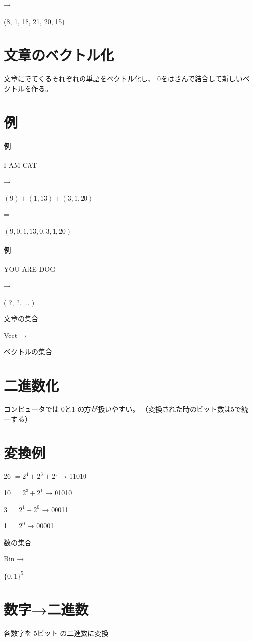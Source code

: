 \documentclass[uplatex,dvipdfmx,11pt,a4paper,openany]{bxjsbook}
\begin{document}
→

(8, 1, 18, 21, 20, 15)


\section{文章のベクトル化}
文章にでてくるそれぞれの単語をベクトル化し、\allowbreak{} 0をはさんで結合して新しいベクトルを作る。

\section{例}
\paragraph{例}
I AM CAT

→

\( (9) + (1, 13) + (3, 1, 20) \)

=

\( (9, 0, 1, 13, 0, 3, 1, 20) \)


\paragraph{例}
YOU ARE DOG

→

( ?, ?, ... )


文章の集合

Vect
→

ベクトルの集合

\section{二進数化}
コンピュータでは 0と1 の方が扱いやすい。\allowbreak{} 
（変換された時のビット数は5で統一する）

\section{変換例}
26
\(= 2^4 + 2^3 + 2^1\)
→
11010

10
\(= 2^3 + 2^1\)
→
01010

3
\(= 2^1 + 2^0\)
→
00011

1
\(= 2^0\)
→
00001

数の集合

Bin
→

\( \{0, 1\}^5 \)

\section{数字→二進数}
各数字を 5ビット の二進数に変換
\end{document}
